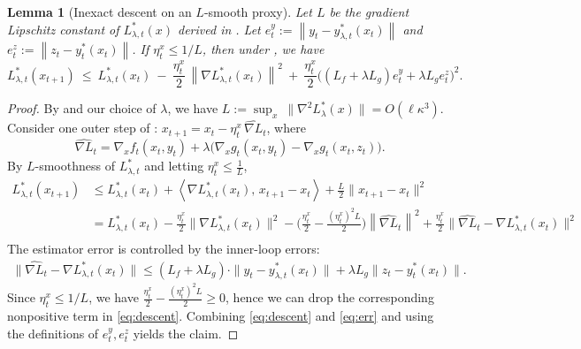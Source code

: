 \documentclass{uai2026} %
\newtheorem{lemma}{Lemma}[section]
\newcommand{\norm}[1]{\left\lVert #1 \right\rVert}
\begin{document}
\begin{lemma}[Inexact descent on an $L$-smooth proxy]\label{lem:descent}
Let $L$ be the gradient Lipschitz constant of $L^{*}_{\lambda,t}(x)$ derived in . Let $e_t^y:=\norm{y_t-y^{*}_{\lambda,t}(x_t)}$ and $e_t^z:=\norm{z_t-y_t^{*}(x_t)}$. If $\eta_t^x\le 1/L$, then under , we have
\[
L^{*}_{\lambda,t}(x_{t+1})\ \le\ L^{*}_{\lambda,t}(x_t)\ -\ \frac{\eta_t^x}{2}\,\norm{\nabla L^{*}_{\lambda,t}(x_t)}^2\ +\ \frac{\eta_t^x}{2}\Big((L_f+\lambda L_g)e_t^y+\lambda L_g e_t^z\Big)^{2}.
\]
\end{lemma}
\begin{proof}
 By  and our choice of $\lambda$, we have $\displaystyle L:=\sup_{x}\ \|\nabla^2 L^{*}_\lambda(x)\|=O(\ell\kappa^3)$. Consider one outer step of : $x_{t+1}=x_t-\eta^x_{t}\,\widehat{\nabla L}_{t}$, where
\[
\widehat{\nabla L}_{t}
=\nabla_x f_{t}(x_t,y_t)+\lambda\big(\nabla_x g_{t}(x_t,y_t)-\nabla_x g_{t}(x_t,z_t)\big).
\]
By $L$-smoothness of $L^{*}_{\lambda,t}$ and letting $\eta^x_{t}\le \frac{1}{L}$,
\begin{align}\label{eq:descent}
    L^{*}_{\lambda,t}(x_{t+1})
&\le L^{*}_{\lambda,t}(x_t)
+\left\langle \nabla L^{*}_{\lambda,t}(x_t),\,x_{t+1}-x_t\right\rangle
+\frac{L}{2}\|x_{t+1}-x_t\|^2\\
&= L^{*}_{\lambda,t}(x_t) - \frac{\eta^x_{t}}{2}\|\nabla L^{*}_{\lambda,t}(x_t)\|^2
-\Big(\frac{\eta^{x}_{t}}{2}-\frac{(\eta^{x}_{t})^2 L}{2}\Big)\left\|\widehat{\nabla L}_{t}\right\|^2
+\frac{\eta^{x}_{t}}{2}\|\widehat{\nabla L}_{t}-\nabla L^{*}_{\lambda,t}(x_t)\|^2\\
\end{align}
The estimator error is controlled by the inner-loop errors:
\begin{align}\label{eq:err}
\|\widehat{\nabla L}_{t}-\nabla L^{*}_{\lambda,t}(x_t)\|
\le (L_{f}+\lambda L_g)\cdot\|y_t-y^{*}_{\lambda,t}(x_t)\|+\lambda L_g\|z_t-y^{*}_{t}(x_t)\|.
\end{align}
Since $\eta^x_t\le 1/L$, we have $\frac{\eta^{x}_{t}}{2}-\frac{(\eta^{x}_{t})^2 L}{2}\ge0$, hence we can drop the corresponding nonpositive term in \eqref{eq:descent}.
Combining \eqref{eq:descent} and \eqref{eq:err} and using the definitions of $e_t^y,e_t^z$ yields the claim.
\end{proof}
\end{document}
